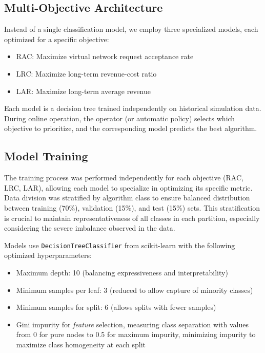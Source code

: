\documentclass[a4paper,twoside]{article}
\begin{document}
\subsection{Multi-Objective Architecture}

Instead of a single classification model, we employ three specialized models, each optimized for a specific objective:

\begin{itemize}
    \item RAC: Maximize virtual network request acceptance rate
    \item LRC: Maximize long-term revenue-cost ratio
    \item LAR: Maximize long-term average revenue
\end{itemize}

Each model is a decision tree trained independently on historical simulation data. During online operation, the operator (or automatic policy) selects which objective to prioritize, and the corresponding model predicts the best algorithm.

\subsection{Model Training}

The training process was performed independently for each objective (RAC, LRC, LAR), allowing each model to specialize in optimizing its specific metric. Data division was stratified by algorithm class to ensure balanced distribution between training (70\%), validation (15\%), and test (15\%) sets. This stratification is crucial to maintain representativeness of all classes in each partition, especially considering the severe imbalance observed in the data.

Models use \texttt{DecisionTreeClassifier} from scikit-learn with the following optimized hyperparameters:

\begin{itemize}
    \item Maximum depth: 10 (balancing expressiveness and interpretability)
    \item Minimum samples per leaf: 3 (reduced to allow capture of minority classes)
    \item Minimum samples for split: 6 (allows splits with fewer samples)
     \item Gini impurity for \textit{feature} selection, measuring class separation with values from 0 for pure nodes to 0.5 for maximum impurity, minimizing impurity to maximize class homogeneity at each split
\end{itemize}
\end{document}
